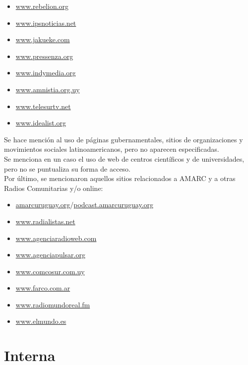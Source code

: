 \begin{itemize}
 \item \href{http://www.rebelion.org}{www.rebelion.org}
 \item \href{http://www.ipsnoticias.net}{www.ipsnoticias.net}
 \item \href{http://www.jakueke.com}{www.jakueke.com}
 \item \href{http://www.pressenza.org}{www.pressenza.org}
 \item \href{http://www.indymedia.org}{www.indymedia.org}
 \item \href{http://www.amnistia.org.uy}{www.amnistia.org.uy}
 \item \href{http://www.telesurtv.net}{www.telesurtv.net}
 \item \href{http://www.idealist.org}{www.idealist.org}
\end{itemize}

Se hace mención al uso de páginas gubernamentales, sitios de organizaciones y movimientos sociales latinoamericanos, pero no aparecen especificadas.\\

Se menciona en un caso el uso de web de centros científicos y de universidades, pero no se puntualiza su forma de acceso.\\

Por último, se mencionaron aquellos sitios relacionados a AMARC y a otras Radios Comunitarias y/o online:\\

\begin{itemize}
 \item \href{http://www.amarcuruguay.org}{amarcuruguay.org}/\href{http://podcast.amarcuruguay.org}{podcast.amarcuruguay.org}
 \item \href{http://www.radialistas.net}{www.radialistas.net}
 \item \href{http://www.agenciaradioweb.com}{www.agenciaradioweb.com}
 \item \href{http://www.agenciapulsar.org}{www.agenciapulsar.org}
 \item \href{http://www.comcosur.com.uy}{www.comcosur.com.uy}
 \item \href{http://www.farco.com.ar}{www.farco.com.ar}
 \item \href{http://www.radiomundoreal.fm}{www.radiomundoreal.fm}
 \item \href{http://www.elmundo.es}{www.elmundo.es}
\end{itemize}

\section{Interna}

